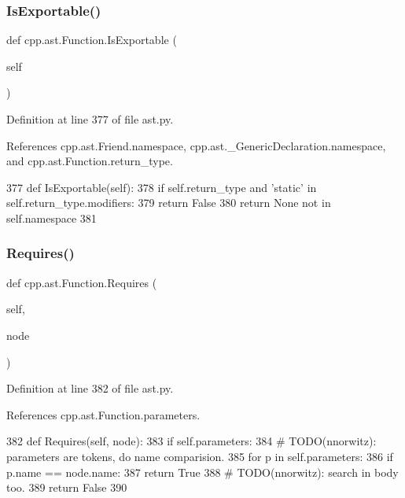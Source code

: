 \subsubsection{\texorpdfstring{Is\+Exportable()}{IsExportable()}}
{\footnotesize\ttfamily def cpp.\+ast.\+Function.\+Is\+Exportable (\begin{DoxyParamCaption}\item[{}]{self }\end{DoxyParamCaption})}



Definition at line 377 of file ast.\+py.



References cpp.\+ast.\+Friend.\+namespace, cpp.\+ast.\+\_\+\+Generic\+Declaration.\+namespace, and cpp.\+ast.\+Function.\+return\+\_\+type.


\begin{DoxyCode}
377     \textcolor{keyword}{def }IsExportable(self):
378         \textcolor{keywordflow}{if} self.return\_type \textcolor{keywordflow}{and} \textcolor{stringliteral}{'static'} \textcolor{keywordflow}{in} self.return\_type.modifiers:
379             \textcolor{keywordflow}{return} \textcolor{keyword}{False}
380         \textcolor{keywordflow}{return} \textcolor{keywordtype}{None} \textcolor{keywordflow}{not} \textcolor{keywordflow}{in} self.namespace
381 
\end{DoxyCode}
\mbox{\label{classcpp_1_1ast_1_1Function_a999e7b5e43517cd4d68b1aeea8a7d6e1}} 
\subsubsection{\texorpdfstring{Requires()}{Requires()}}
{\footnotesize\ttfamily def cpp.\+ast.\+Function.\+Requires (\begin{DoxyParamCaption}\item[{}]{self,  }\item[{}]{node }\end{DoxyParamCaption})}



Definition at line 382 of file ast.\+py.



References cpp.\+ast.\+Function.\+parameters.


\begin{DoxyCode}
382     \textcolor{keyword}{def }Requires(self, node):
383         \textcolor{keywordflow}{if} self.parameters:
384             \textcolor{comment}{# TODO(nnorwitz): parameters are tokens, do name comparision.}
385             \textcolor{keywordflow}{for} p \textcolor{keywordflow}{in} self.parameters:
386                 \textcolor{keywordflow}{if} p.name == node.name:
387                     \textcolor{keywordflow}{return} \textcolor{keyword}{True}
388         \textcolor{comment}{# TODO(nnorwitz): search in body too.}
389         \textcolor{keywordflow}{return} \textcolor{keyword}{False}
390 
\end{DoxyCode}


